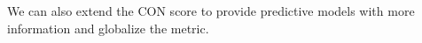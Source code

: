 \documentclass[preview]{standalone}
\begin{document}
We can also extend the CON score to provide predictive models with more information and globalize the metric.\\
\end{document}
